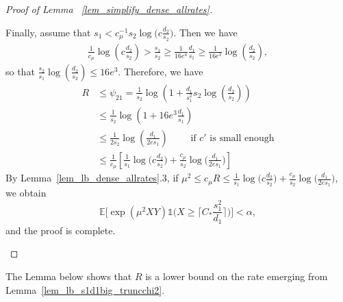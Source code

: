 \documentclass{article}
\newcommand{\EE}{\mathbb{E}}
\newcommand{\one}{\mathds{1}}
\newcommand{\Ct}{C_{*}}
\theoremstyle{remark}
\begin{document}
\begin{proof}[Proof of Lemma ~\ref{lem_simplify_dense_allrates}]
\begin{enumerate}
    Finally, assume that $s_1 < c_\mu^{-1}s_2\log\big(c\frac{d_2}{s_2}\big)$. 
    Then we have
    \begin{align*}
        \frac{1}{c_\mu}\log\left(c\frac{d_2}{s_2}\right) > \frac{s_1}{s_2} \geq \frac{1}{16e^4} \frac{d_1}{s_1} \geq \frac{1}{16e^3} \log\left(\frac{d_2}{s_2}\right),
    \end{align*}
    so that $\frac{s_2}{s_1} \log\left(\frac{d_2}{s_2}\right) \leq 16e^3$. 
    Therefore, we have
    \begin{align*}
        R &\leq \psi_{21} = \frac{1}{s_2} \log\left(1+\frac{d_1}{s_1^2}s_2\log\left(\frac{d_2}{s_2}\right)\right)\\
        & \leq \frac{1}{s_2} \log\left(1+16e^3\frac{d_1}{s_1}\right)\\
        & \leq \frac{1}{2s_2} \log\left(\frac{d_1}{2es_1}\right) \qquad \text{ if $c'$ is small enough} \\
        & \leq \frac{1}{c_\mu}\left[\frac{1}{s_1}\log\big(c \frac{d_2}{s_2}\big) + \frac{c_\mu}{s_2}\log\big(\frac{d_1}{2es_1}\big)\right]
    \end{align*}
    By Lemma~\ref{lem_lb_dense_allrates}.3, if $\mu^2 \leq c_\mu R \leq \frac{1}{s_1}\log\big(c \frac{d_2}{s_2}\big) + \frac{c_\mu}{s_2}\log\big(\frac{d_1}{2es_1}\big)$, we obtain
    \[\EE\Big[\exp(\mu^2XY)\one\big(X \geq \lceil  \Ct \frac{s_1^2}{d_1}\rceil\big)\Big] < \alpha,\]
    and the proof is complete.
    \end{enumerate}
\end{proof}
The Lemma below shows that $R$ is a lower bound on the rate emerging from Lemma~\ref{lem_lb_s1d1big_truncchi2}.
\end{document}
